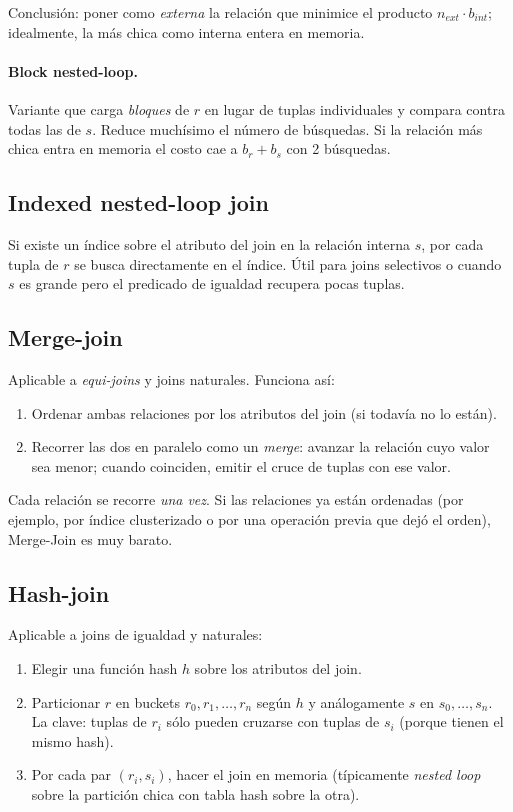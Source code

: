 \documentclass[11pt,a4paper]{article}
\begin{document}
Conclusión: poner como \emph{externa} la relación que minimice el producto
$n_{ext} \cdot b_{int}$; idealmente, la más chica como interna entera en
memoria.

\paragraph{Block nested-loop.} Variante que carga \emph{bloques} de $r$
en lugar de tuplas individuales y compara contra todas las de $s$. Reduce
muchísimo el número de búsquedas. Si la relación más chica entra en memoria
el costo cae a $b_r + b_s$ con 2 búsquedas.

\subsection{Indexed nested-loop join}

Si existe un índice sobre el atributo del join en la relación interna $s$,
por cada tupla de $r$ se busca directamente en el índice. Útil para joins
selectivos o cuando $s$ es grande pero el predicado de igualdad recupera
pocas tuplas.

\subsection{Merge-join}

Aplicable a \emph{equi-joins} y joins naturales. Funciona así:

\begin{enumerate}
    \item Ordenar ambas relaciones por los atributos del join (si todavía no
    lo están).
    \item Recorrer las dos en paralelo como un \emph{merge}: avanzar la
    relación cuyo valor sea menor; cuando coinciden, emitir el cruce de
    tuplas con ese valor.
\end{enumerate}

Cada relación se recorre \emph{una vez}. Si las relaciones ya están
ordenadas (por ejemplo, por índice clusterizado o por una operación previa
que dejó el orden), Merge-Join es muy barato.

\subsection{Hash-join}

Aplicable a joins de igualdad y naturales:

\begin{enumerate}
    \item Elegir una función hash $h$ sobre los atributos del join.
    \item Particionar $r$ en buckets $r_0, r_1, \ldots, r_n$ según $h$ y
    análogamente $s$ en $s_0, \ldots, s_n$. La clave: tuplas de $r_i$ sólo
    pueden cruzarse con tuplas de $s_i$ (porque tienen el mismo hash).
    \item Por cada par $(r_i, s_i)$, hacer el join en memoria (típicamente
    \emph{nested loop} sobre la partición chica con tabla hash sobre la
    otra).
\end{enumerate}
\end{document}
